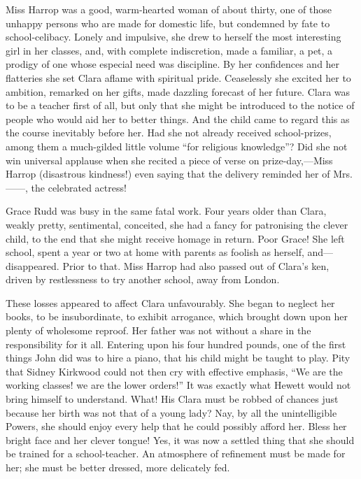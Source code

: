 Miss Harrop was a good, warm-hearted woman of about thirty, one of those
unhappy persons who are made for domestic life, but condemned by fate to
school-celibacy. Lonely and impulsive, she drew to herself the most
interesting girl in her classes, and, with complete indiscretion, made a
familiar, a pet, a prodigy of one whose especial need was discipline. By
her confidences and her flatteries she set Clara aflame with spiritual
pride. Ceaselessly she excited her to ambition, remarked on her gifts,
made dazzling forecast of her future. Clara was to be a teacher first of
all, but only that she might be introduced to the notice of people who
would aid her to better things. And the
{\protect\hypertarget{195}{}{}}child came to regard this as the course
inevitably before her. Had she not already received school-prizes, among
them a much-gilded little volume ``for religious knowledge''? Did she
not win universal applause when she recited a piece of verse on
prize-day,---Miss Harrop (disastrous kindness!) even saying that the
delivery reminded her of Mrs. {{------}}, the celebrated actress!

Grace Rudd was busy in the same fatal work. Four years older than Clara,
weakly pretty, sentimental, conceited, she had a fancy for patronising
the clever child, to the end that she might receive homage in return.
Poor Grace! She left school, spent a year or two at home with parents as
foolish as herself, and---disappeared. Prior to that. Miss Harrop had
also passed out of Clara's ken, driven by restlessness to try another
school, away from London.

These losses appeared to affect Clara unfavourably. She began to neglect
her books, to be insubordinate, to exhibit arrogance, which brought down
upon her plenty of {\protect\hypertarget{196}{}{}}wholesome reproof. Her
father was not without a share in the responsibility for it all.
Entering upon his four hundred pounds, one of the first things John did
was to hire a piano, that his child might be taught to play. Pity that
Sidney Kirkwood could not then cry with effective emphasis, ``We are the
working classes! we are the lower orders!'' It was exactly what Hewett
would not bring himself to understand. What! His Clara must be robbed of
chances just because her birth was not that of a young lady? Nay, by all
the unintelligible Powers, she should enjoy every help that he could
possibly afford her. Bless her bright face and her clever tongue! Yes,
it was now a settled thing that she should be trained for a
school-teacher. An atmosphere of refinement must be made for her; she
must be better dressed, more delicately fed.

